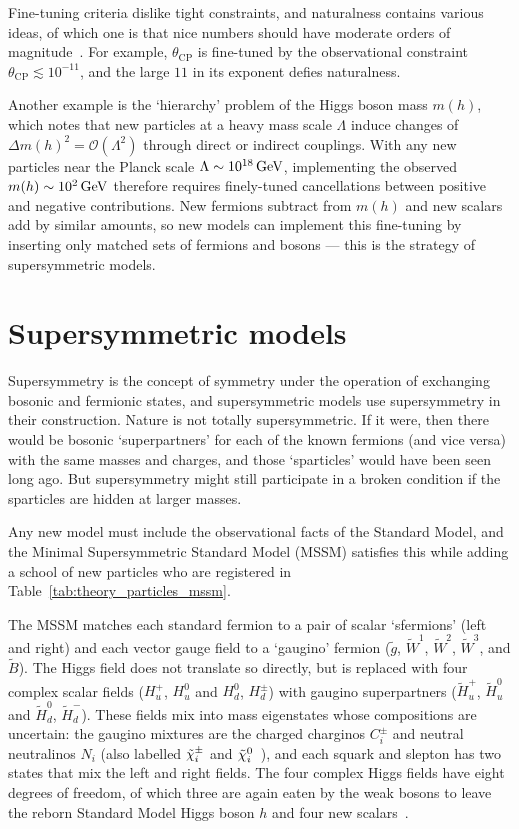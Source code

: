 Fine-tuning criteria dislike tight constraints, and naturalness contains
various ideas, of which one is that nice numbers should have moderate orders of
magnitude~\cite{giudice2008naturally}.
For example, $\theta_\mathrm{CP}$ is fine-tuned by the observational constraint
$\theta_\mathrm{CP} \lesssim 10^{-11}$, and the large $11$ in its exponent
defies naturalness.

Another example is the `hierarchy' problem of the Higgs boson mass $m(h)$,
which notes that new particles at a heavy mass scale $\Lambda$ induce changes
of $\Delta m(h)^2 = \mathcal{O}(\Lambda^2)$
through direct or indirect couplings.
With any new particles near the Planck scale $\Lambda \sim 10^{18}\,\eV[G]$,
implementing the observed $m(h) \sim 10^{2}\,\eV[G]$ therefore requires
finely-tuned cancellations between positive and negative contributions.
New fermions subtract from $m(h)$ and new scalars add by similar amounts,
so new models can implement this fine-tuning by inserting only matched sets of
fermions and bosons --- this is the strategy of supersymmetric models.


\section{Supersymmetric models}
\label{sec:theory_susy}
Supersymmetry is the concept of symmetry under the operation of exchanging
bosonic and fermionic states, and supersymmetric models use supersymmetry in
their construction.
Nature is not totally supersymmetric.
If it were, then there would be bosonic `superpartners' for each of the known
fermions (and vice versa) with the same masses and charges, and those
`sparticles' would have been seen long ago.
But supersymmetry might still participate in a broken condition if the
sparticles are hidden at larger masses.

Any new model must include the observational facts of the Standard Model,
and the Minimal Supersymmetric Standard Model (MSSM) satisfies this while
adding a school of new particles
who are registered in Table~\ref{tab:theory_particles_mssm}.

The MSSM matches each standard fermion to a pair of scalar
`sfermions' (left and right)
and each vector gauge field to a `gaugino' fermion
($\tilde g$, $\tilde W^1$, $\tilde W^2$, $\tilde W^3$, and $\tilde B$).
The Higgs field does not translate so directly, but is replaced with four
complex scalar fields
($H^+_u$, $H^0_u$ and $H^0_d$, $H^\pm_d$) with
gaugino superpartners
($\tilde H^+_u$, $\tilde H^0_u$ and $\tilde H^0_d$, $\tilde H^-_d$).
These fields mix into mass eigenstates whose compositions are uncertain:
the gaugino mixtures are the charged charginos $C^\pm_i$ and
neutral neutralinos $N_i$
(also labelled $\chargino_i$ and $\neutralino_i$~\cite{atlas2022searches}),
and each squark and slepton has two states that mix the left and right fields.
The four complex Higgs fields have eight degrees of freedom, of which three are
again eaten by the weak bosons to leave the reborn Standard Model Higgs boson $h$
and four new scalars~\cite{martin2016primer}.

